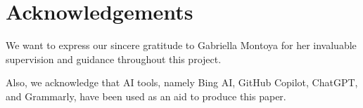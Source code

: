\section{Acknowledgements}\label{sec:acknowledgements}
We want to express our sincere gratitude to Gabriella Montoya for her invaluable supervision and guidance throughout this project.

Also, we acknowledge that AI tools, namely Bing AI, GitHub Copilot, ChatGPT, and Grammarly, have been used as an aid to produce this paper.